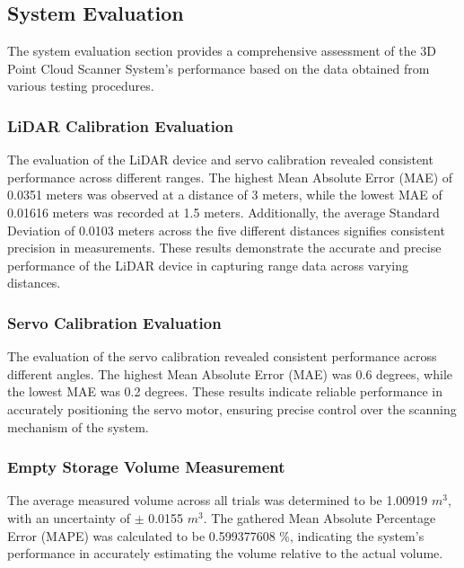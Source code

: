
\subsection{System Evaluation}
The system evaluation section provides a comprehensive assessment of the 3D Point Cloud Scanner System's performance based on the data obtained from various testing procedures.

\subsubsection{LiDAR Calibration Evaluation}
The evaluation of the LiDAR device and servo calibration revealed consistent performance across different ranges. The highest Mean Absolute Error (MAE) of 0.0351 meters was observed at a distance of 3 meters, while the lowest MAE of 0.01616 meters was recorded at 1.5 meters. Additionally, the average Standard Deviation of 0.0103 meters across the five different distances signifies consistent precision in measurements. These results demonstrate the accurate and precise performance of the LiDAR device in capturing range data across varying distances.

\subsubsection{Servo Calibration Evaluation}
The evaluation of the servo calibration revealed consistent performance across different angles. The highest Mean Absolute Error (MAE) was 0.6 degrees, while the lowest MAE was 0.2 degrees. These results indicate reliable performance in accurately positioning the servo motor, ensuring precise control over the scanning mechanism of the system.

\subsubsection{Empty Storage Volume Measurement}
The average measured volume across all trials was determined to be 1.00919 $m^{3}$, with an uncertainty of $\pm$ 0.0155 $m^{3}$. The gathered Mean Absolute Percentage Error (MAPE) was calculated to be 0.599377608 \%, indicating the system's performance in accurately estimating the volume relative to the actual volume.

